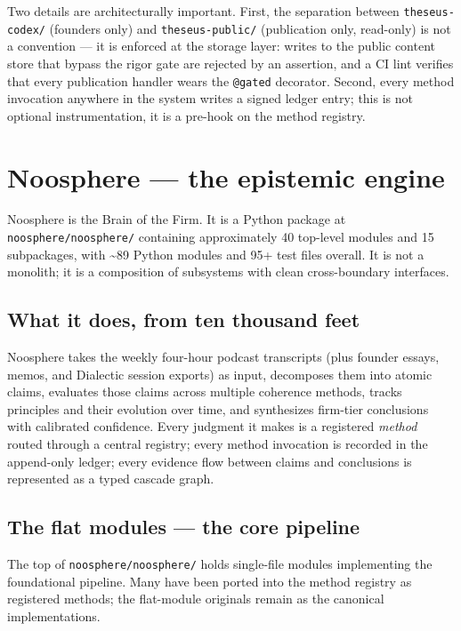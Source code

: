 \documentclass[11pt,letterpaper]{article}
\newcommand{\file}[1]{\texttt{#1}}
\begin{document}
Two details are architecturally important. First, the separation between \file{theseus-codex/} (founders only) and \file{theseus-public/} (publication only, read-only) is not a convention --- it is enforced at the storage layer: writes to the public content store that bypass the rigor gate are rejected by an assertion, and a CI lint verifies that every publication handler wears the \texttt{@gated} decorator. Second, every method invocation anywhere in the system writes a signed ledger entry; this is not optional instrumentation, it is a pre-hook on the method registry.

\section{Noosphere --- the epistemic engine}

Noosphere is the Brain of the Firm. It is a Python package at \file{noosphere/noosphere/} containing approximately 40 top-level modules and 15 subpackages, with \textasciitilde 89 Python modules and 95+ test files overall. It is not a monolith; it is a composition of subsystems with clean cross-boundary interfaces.

\subsection{What it does, from ten thousand feet}

Noosphere takes the weekly four-hour podcast transcripts (plus founder essays, memos, and Dialectic session exports) as input, decomposes them into atomic claims, evaluates those claims across multiple coherence methods, tracks principles and their evolution over time, and synthesizes firm-tier conclusions with calibrated confidence. Every judgment it makes is a registered \emph{method} routed through a central registry; every method invocation is recorded in the append-only ledger; every evidence flow between claims and conclusions is represented as a typed cascade graph.

\subsection{The flat modules --- the core pipeline}

The top of \file{noosphere/noosphere/} holds single-file modules implementing the foundational pipeline. Many have been ported into the method registry as registered methods; the flat-module originals remain as the canonical implementations.
\end{document}
